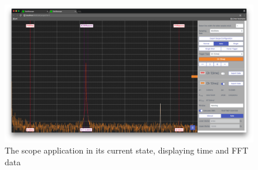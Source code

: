 \begin{figure}
    \centering
    \includegraphics[width=1\textwidth]{images/gui/scope}
    \caption[The Scope Application]{%
        The scope application in its current state, displaying time and FFT data%
    }
    \label{fig:userguide:screenshot}
\end{figure}


